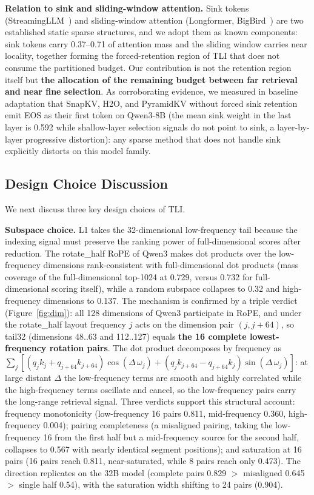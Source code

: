 \documentclass[11pt]{article}
\begin{document}
\textbf{Relation to sink and sliding-window attention.} Sink tokens (StreamingLLM~\cite{streamingllm}) and sliding-window attention (Longformer, BigBird~\cite{longformer,bigbird}) are two established static sparse structures, and we adopt them as known components: sink tokens carry 0.37--0.71 of attention mass and the sliding window carries near locality, together forming the forced-retention region of TLI that does not consume the partitioned budget. Our contribution is not the retention region itself but \textbf{the allocation of the remaining budget between far retrieval and near fine selection}. As corroborating evidence, we measured in baseline adaptation that SnapKV, H2O, and PyramidKV without forced sink retention emit EOS as their first token on Qwen3-8B (the mean sink weight in the last layer is 0.592 while shallow-layer selection signals do not point to sink, a layer-by-layer progressive distortion): any sparse method that does not handle sink explicitly distorts on this model family.

\subsection{Design Choice Discussion}

We next discuss three key design choices of TLI.

\textbf{Subspace choice.} L1 takes the 32-dimensional low-frequency tail because the indexing signal must preserve the ranking power of full-dimensional scores after reduction. The rotate\_half RoPE of Qwen3 makes dot products over the low-frequency dimensions rank-consistent with full-dimensional dot products (mass coverage of the full-dimensional top-1024 at 0.729, versus 0.732 for full-dimensional scoring itself), while a random subspace collapses to 0.32 and high-frequency dimensions to 0.137. The mechanism is confirmed by a triple verdict (Figure~\ref{fig:dim}): all 128 dimensions of Qwen3 participate in RoPE, and under the rotate\_half layout frequency $j$ acts on the dimension pair $(j, j{+}64)$, so tail32 (dimensions 48..63 and 112..127) equals \textbf{the 16 complete lowest-frequency rotation pairs}. The dot product decomposes by frequency as $\sum_j [(q_j k_j + q_{j+64} k_{j+64})\cos(\Delta\,\omega_j) + (q_j k_{j+64} - q_{j+64} k_j)\sin(\Delta\,\omega_j)]$: at large distant $\Delta$ the low-frequency terms are smooth and highly correlated while the high-frequency terms oscillate and cancel, so the low-frequency pairs carry the long-range retrieval signal. Three verdicts support this structural account: frequency monotonicity (low-frequency 16 pairs 0.811, mid-frequency 0.360, high-frequency 0.004); pairing completeness (a misaligned pairing, taking the low-frequency 16 from the first half but a mid-frequency source for the second half, collapses to 0.567 with nearly identical segment positions); and saturation at 16 pairs (16 pairs reach 0.811, near-saturated, while 8 pairs reach only 0.473). The direction replicates on the 32B model (complete pairs 0.829 $>$ misaligned 0.645 $>$ single half 0.54), with the saturation width shifting to 24 pairs (0.904).
\end{document}
